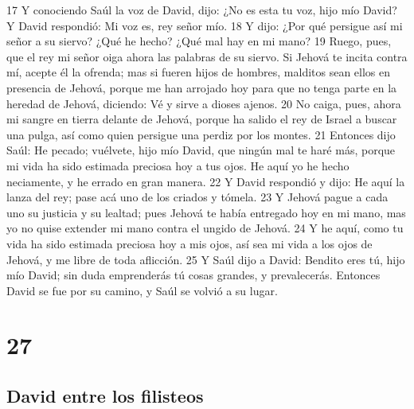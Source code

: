 17 Y conociendo Saúl la voz de David, dijo: ¿No es esta tu voz, hijo mío David? Y David respondió: Mi voz es, rey señor mío.
18 Y dijo: ¿Por qué persigue así mi señor a su siervo? ¿Qué he hecho? ¿Qué mal hay en mi mano?
19 Ruego, pues, que el rey mi señor oiga ahora las palabras de su siervo. Si Jehová te incita contra mí, acepte él la ofrenda; mas si fueren hijos de hombres, malditos sean ellos en presencia de Jehová, porque me han arrojado hoy para que no tenga parte en la heredad de Jehová, diciendo: Vé y sirve a dioses ajenos.
20 No caiga, pues, ahora mi sangre en tierra delante de Jehová, porque ha salido el rey de Israel a buscar una pulga, así como quien persigue una perdiz por los montes.
21 Entonces dijo Saúl: He pecado; vuélvete, hijo mío David, que ningún mal te haré más, porque mi vida ha sido estimada preciosa hoy a tus ojos. He aquí yo he hecho neciamente, y he errado en gran manera.
22 Y David respondió y dijo: He aquí la lanza del rey; pase acá uno de los criados y tómela.
23 Y Jehová pague a cada uno su justicia y su lealtad; pues Jehová te había entregado hoy en mi mano, mas yo no quise extender mi mano contra el ungido de Jehová.
24 Y he aquí, como tu vida ha sido estimada preciosa hoy a mis ojos, así sea mi vida a los ojos de Jehová, y me libre de toda aflicción.
25 Y Saúl dijo a David: Bendito eres tú, hijo mío David; sin duda emprenderás tú cosas grandes, y prevalecerás. Entonces David se fue por su camino, y Saúl se volvió a su lugar.

\chapter{27}

\section*{David entre los filisteos}



